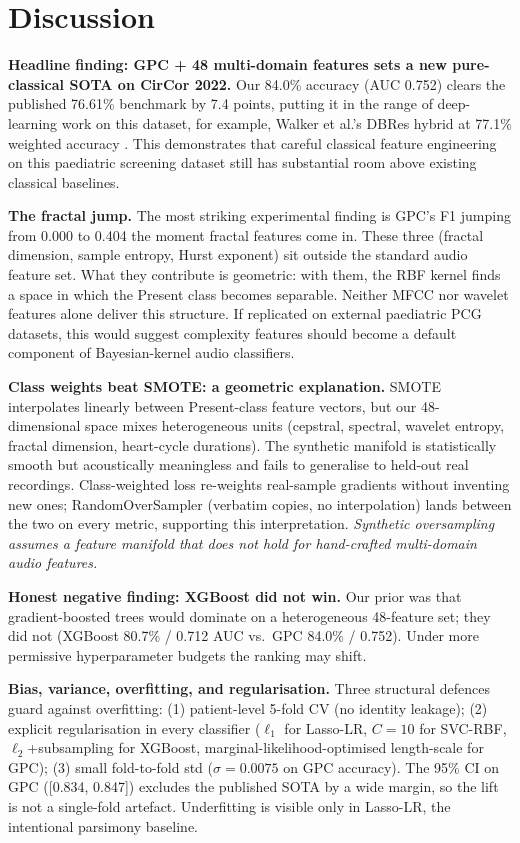 \documentclass[10pt,twocolumn]{article}
\begin{document}
\section{Discussion}\label{sec:discussion}

\textbf{Headline finding: GPC + 48 multi-domain features sets a new pure-classical SOTA on CirCor 2022.} Our 84.0\% accuracy (AUC 0.752) clears the published 76.61\% benchmark by 7.4 points, putting it in the range of deep-learning work on this dataset, for example, Walker et al.'s DBRes hybrid at 77.1\% weighted accuracy \citep{walker2022dbres}. This demonstrates that careful classical feature engineering on this paediatric screening dataset still has substantial room above existing classical baselines.

\textbf{The fractal jump.} The most striking experimental finding is GPC's F1 jumping from 0.000 to 0.404 the moment fractal features come in. These three (fractal dimension, sample entropy, Hurst exponent) sit outside the standard audio feature set. What they contribute is geometric: with them, the RBF kernel finds a space in which the Present class becomes separable. Neither MFCC nor wavelet features alone deliver this structure. If replicated on external paediatric PCG datasets, this would suggest complexity features should become a default component of Bayesian-kernel audio classifiers.

\textbf{Class weights beat SMOTE: a geometric explanation.} SMOTE interpolates linearly between Present-class feature vectors, but our 48-dimensional space mixes heterogeneous units (cepstral, spectral, wavelet entropy, fractal dimension, heart-cycle durations). The synthetic manifold is statistically smooth but acoustically meaningless and fails to generalise to held-out real recordings. Class-weighted loss re-weights real-sample gradients without inventing new ones; RandomOverSampler (verbatim copies, no interpolation) lands between the two on every metric, supporting this interpretation. \textit{Synthetic oversampling assumes a feature manifold that does not hold for hand-crafted multi-domain audio features.}

\textbf{Honest negative finding: XGBoost did not win.} Our prior was that gradient-boosted trees would dominate on a heterogeneous 48-feature set; they did not (XGBoost 80.7\% / 0.712 AUC vs.\ GPC 84.0\% / 0.752). Under more permissive hyperparameter budgets the ranking may shift.

\textbf{Bias, variance, overfitting, and regularisation.} Three structural defences guard against overfitting: (1) patient-level 5-fold CV (no identity leakage); (2) explicit regularisation in every classifier ($\ell_1$ for Lasso-LR, $C=10$ for SVC-RBF, $\ell_2$+subsampling for XGBoost, marginal-likelihood-optimised length-scale for GPC); (3) small fold-to-fold std ($\sigma=0.0075$ on GPC accuracy). The 95\% CI on GPC ([0.834, 0.847]) excludes the published SOTA by a wide margin, so the lift is not a single-fold artefact. Underfitting is visible only in Lasso-LR, the intentional parsimony baseline.
\end{document}
